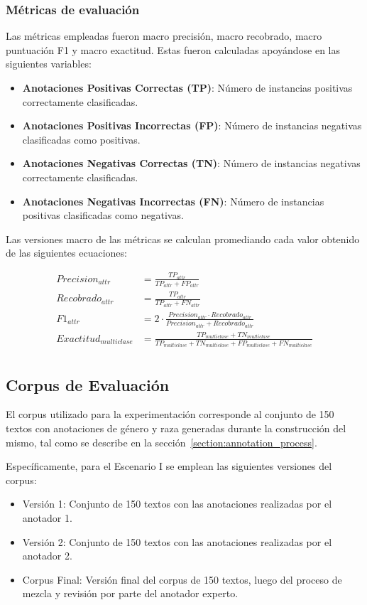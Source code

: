 \subsubsection{M\'etricas de evaluaci\'on}
Las m\'etricas empleadas fueron macro precisi\'on, macro recobrado, macro puntuaci\'on F1 y 
macro exactitud. Estas fueron calculadas apoy\'andose en las siguientes variables: 

\begin{itemize}
    \item \textbf{Anotaciones Positivas Correctas (TP)}: N\'umero de instancias positivas correctamente clasificadas.
    \item \textbf{Anotaciones Positivas Incorrectas (FP)}: N\'umero de instancias negativas clasificadas como positivas.
    \item \textbf{Anotaciones Negativas Correctas (TN)}: N\'umero de instancias negativas correctamente clasificadas.
    \item \textbf{Anotaciones Negativas Incorrectas (FN)}: N\'umero de instancias positivas clasificadas como negativas.
\end{itemize}

Las versiones macro de las m\'etricas se calculan promediando cada valor obtenido de las siguientes ecuaciones:

\begin{align*}
    Precision_{attr} &= \frac{TP_{attr}}{TP_{attr} + FP_{attr}}\\
    Recobrado_{attr} &= \frac{TP_{attr}}{TP_{attr} + FN_{attr}}\\
    F1_{attr} &= 2 \cdot \frac{{Precision_{attr}} \cdot {Recobrado_{attr}}}{{Precision_{attr}} + {Recobrado_{attr}}}\\
    Exactitud_{multiclase} &= \frac{TP_{multiclase} + TN_{multiclase}}{TP_{multiclase} + TN_{multiclase} + FP_{multiclase} + FN_{multiclase}}\\
\end{align*}


\subsection{Corpus de Evaluaci\'on}
El corpus utilizado para la experimentaci\'on corresponde al conjunto de 150 textos con anotaciones de g\'enero y raza
generadas durante la construcci\'on del mismo, tal como se describe en la secci\'on~\ref{section:annotation_process}.

Espec\'ificamente, para el Escenario I se emplean las siguientes versiones del corpus:
\begin{itemize}
    \item Versi\'on 1: Conjunto de 150 textos con las anotaciones realizadas por el anotador 1.
    \item Versi\'on 2: Conjunto de 150 textos con las anotaciones realizadas por el anotador 2.
    \item Corpus Final: Versi\'on final del corpus de 150 textos, luego del proceso de mezcla y revisi\'on por parte 
    del anotador experto.
\end{itemize}

